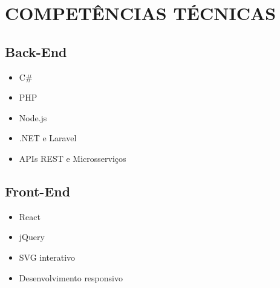 \documentclass[11pt,a4paper]{article}
\begin{document}
\vspace{15pt}

\section{COMPETÊNCIAS TÉCNICAS}

\begin{minipage}[t]{0.48\textwidth}
    \subsection{Back-End}
    \begin{itemize}[leftmargin=15pt, topsep=0pt, itemsep=1pt]
        \item C\#
        \item PHP
        \item Node.js
        \item .NET e Laravel
        \item APIs REST e Microsserviços
    \end{itemize}
    
    \vspace{8pt}
    
    \subsection{Front-End}
    \begin{itemize}[leftmargin=15pt, topsep=0pt, itemsep=1pt]
        \item React
        \item jQuery
        \item SVG interativo
        \item Desenvolvimento responsivo
    \end{itemize}
\end{minipage}
\hfill
\end{document}
